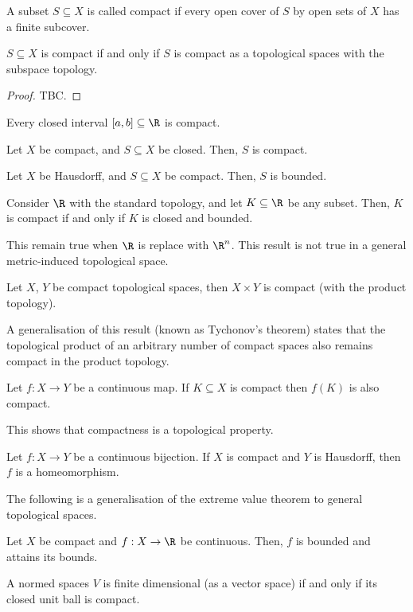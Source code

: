 \begin{ndfn}
  A subset $S \subseteq X$ is called compact if every open cover of $S$ by open sets of $X$ has a finite subcover.
\end{ndfn}

\begin{nlemma}
  $S \subseteq X$ is compact if and only if $S$ is compact as a topological spaces with the subspace topology.
\end{nlemma}
\begin{proof}
  TBC.
\end{proof}

\begin{nthm}
  Every closed interval $[a,b] \subseteq \R$ is compact.
\end{nthm}

\begin{nthm}
  Let $X$ be compact, and $S \subseteq X$ be closed. Then, $S$ is compact.
\end{nthm}

\begin{nthm}
  Let $X$ be Hausdorff, and $S \subseteq X$ be compact. Then, $S$ is bounded.
\end{nthm}

\begin{nthm}
  Consider $\R$ with the standard topology, and let $K \subseteq \R$ be any subset. Then, $K$ is compact if and only if $K$ is closed and bounded.
\end{nthm}
This remain true when $\R$ is replace with $\R^n$. This result is not true in a general metric-induced topological space.

\begin{nthm}
  Let $X$, $Y$ be compact topological spaces, then $X \times Y$ is compact (with the product topology).
\end{nthm}

A generalisation of this result (known as Tychonov's theorem) states that the topological product of an arbitrary number of compact spaces also remains compact in the product topology.

\begin{nthm}
  Let $f: X \to Y$ be a continuous map. If $K \subseteq X$ is compact then $f(K)$ is also compact.
\end{nthm}
This shows that compactness is a topological property.

\begin{nthm}
  Let $f: X \to Y$ be a continuous bijection. If $X$ is compact and $Y$ is Hausdorff, then $f$ is a homeomorphism.
\end{nthm}

The following is a generalisation of the extreme value theorem to general topological spaces.
\begin{nthm}
  Let $X$ be compact and $f: X \to \R$ be continuous. Then, $f$ is bounded and attains its bounds.
\end{nthm}

\begin{ndfn}
  A normed spaces $V$ is finite dimensional (as a vector space) if and only if its closed unit ball is compact.
\end{ndfn}